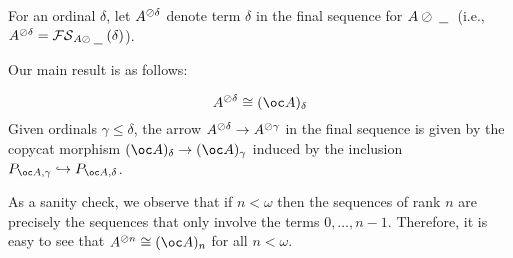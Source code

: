 \documentclass[11pt]{article} %
\begin{document}
For an ordinal $\delta$, let $A^{\oslash\delta}$ denote term $\delta$ in the final sequence for $A\oslash\;\underline{\hspace{1.5ex}}\;$ (i.e., $A^{\oslash\delta}=\mathcal{FS}_{A\oslash\;\underline{\hspace{1.5ex}}\;}(\delta)$).  

Our main result is as follows:

\begin{theorem}
  \label{MainFinalSequenceResult}
  \[
    A^{\sequoid\delta}\cong (\oc A)_\delta
    \]
  Given ordinals $\gamma\le\delta$, the arrow $A^{\oslash\delta}\to A^{\oslash\gamma}$ in the final sequence is given by the copycat morphism $(\oc A)_\delta\to(\oc A)_\gamma$ induced by the inclusion $P_{\oc A, \gamma}\hookrightarrow P_{\oc A, \delta}$.  
\end{theorem}

As a sanity check, we observe that if $n<\omega$ then the sequences of rank $n$ are precisely the sequences that only involve the terms $0,\dots,n-1$.  Therefore, it is easy to see that $A^{\sequoid n}\cong(\oc A)_n$ for all $n<\omega$.  
\end{document}
